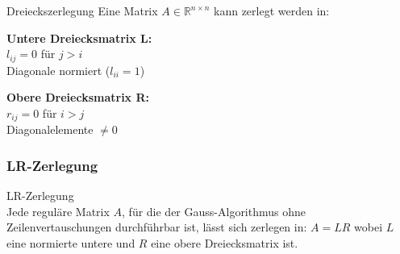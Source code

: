 \begin{definition}{Dreieckszerlegung}
Eine Matrix $A \in \mathbb{R}^{n\times n}$ kann zerlegt werden in:
\vspace{1mm}\\
\begin{minipage}[t]{0.5\textwidth}
    \textbf{Untere Dreiecksmatrix L:}\\
    $l_{ij} = 0$ für $j > i$\\
    Diagonale normiert ($l_{ii}=1$)
\end{minipage}
\hspace{3mm}
\begin{minipage}[t]{0.45\textwidth}
    \textbf{Obere Dreiecksmatrix R:}\\
    $r_{ij} = 0$ für $i > j$\\
    Diagonalelemente $\neq 0$
\end{minipage}
\end{definition}


\subsubsection{LR-Zerlegung}

\begin{theorem}{LR-Zerlegung}\\
Jede reguläre Matrix $A$, für die der Gauss-Algorithmus ohne Zeilenvertauschungen durchführbar ist, lässt sich zerlegen in:
$A = LR$
wobei $L$ eine normierte untere und $R$ eine obere Dreiecksmatrix ist.
\end{theorem}

